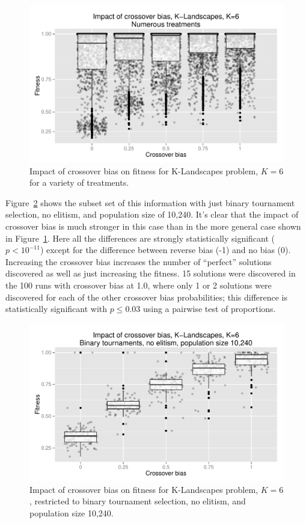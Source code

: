 \documentclass{sig-alternate}
\begin{document}
\begin{figure}
\centering
\includegraphics[width=0.45 \textwidth]{Plots/KLandscapes6_XO_bias_impact_transformed_boxplot_alpha075.pdf}
\caption{Impact of crossover bias on fitness for K-Landscapes problem, $K=6$ for a variety of treatments.}
\label{fig:KLandscapes6_results}
\end{figure}

Figure~\ref{fig:KLandscapes6_strong_results} shows the subset set of this information with just binary tournament 
selection, no elitism, and population size of 10,240. It's clear that the impact of crossover bias is much stronger in this 
case than in the more general case shown in Figure~\ref{fig:KLandscapes6_results}. Here all the differences are strongly 
statistically significant ($p < 10^{-11}$) except for the difference between reverse bias (-1) and no bias (0). Increasing 
the crossover bias increases the number of ``perfect'' solutions discovered as well as just increasing the fitness. 15 
solutions were discovered in the 100 runs with crossover bias at 1.0, where only 1 or 2 solutions were discovered for 
each of the other crossover bias probabilities; this difference is statistically significant with $p \leq 0.03$ using a 
pairwise test of proportions.

\begin{figure}
\centering
\includegraphics[width=0.45 \textwidth]{Plots/KLandscapes6_XO_bias_strong_impact_alpha_075.pdf}
\caption{Impact of crossover bias on fitness for K-Landscapes problem, $K=6$, restricted to binary tournament 
selection, no elitism, and population size 10,240.}
\label{fig:KLandscapes6_strong_results}
\end{figure}

%
%
%
%
\end{document}
